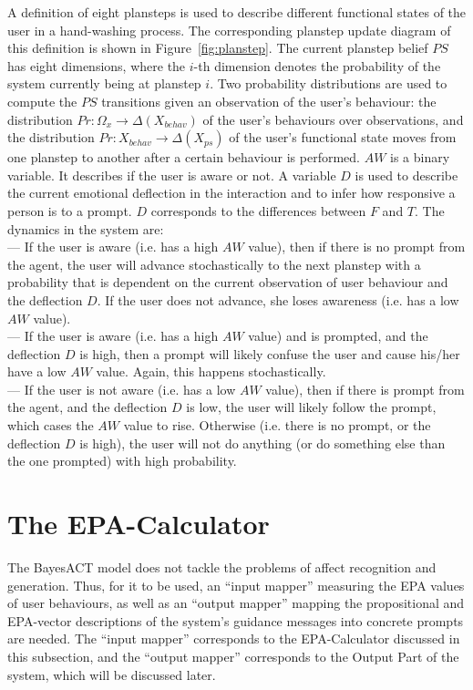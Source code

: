 A definition of eight plansteps is used to describe different functional states of the user in a hand-washing process. The corresponding planstep update diagram of this definition is shown in Figure~\ref{fig:planstep}. The current planstep belief $PS$ has eight dimensions, where the $i$-th dimension denotes the probability of the system currently being at planstep $i$. Two probability distributions are used to compute the $PS$ transitions given an observation of the user's behaviour: the distribution $Pr: \Omega_{x} \to \Delta(X_{behav})$ of the user's behaviours over observations, and the distribution $Pr: X_{behav} \to \Delta(X_{ps})$ of the user's functional state moves from one planstep to another after a certain behaviour is performed. $AW$ is a binary variable. It describes if the user is aware or not. A variable $D$ is used to describe the current emotional deflection in the interaction and to infer how responsive a person is to a prompt. $D$ corresponds to the differences between $F$ and $T$. The dynamics in the system are: \\
--- If the user is aware (i.e. has a high $AW$ value), then if there is no prompt from the agent, the user will advance stochastically to the next planstep with a probability that is dependent on the current observation of user behaviour and the deflection $D$. If the user does not advance, she loses awareness (i.e. has a low $AW$ value). \\
--- If the user is aware (i.e. has a high $AW$ value) and is prompted, and the deflection $D$ is high, then a prompt will likely confuse the user and cause his/her have a low $AW$ value. Again, this happens stochastically. \\
--- If the user is not aware (i.e. has a low $AW$ value), then if there is prompt from the agent, and the deflection $D$ is low, the user will likely follow the prompt, which cases the $AW$ value to rise. Otherwise (i.e. there is no prompt, or the deflection $D$ is high), the user will not do anything (or do something else than the one prompted) with high probability.

\section{The EPA-Calculator}

The BayesACT model does not tackle the problems of affect recognition and generation. Thus, for it to be used, an ``input mapper'' measuring the EPA values of user behaviours, as well as an ``output mapper'' mapping the propositional and EPA-vector descriptions of the system's guidance messages into concrete prompts are needed. The ``input mapper'' corresponds to the EPA-Calculator discussed in this subsection, and the ``output mapper'' corresponds to the Output Part of the system, which will be discussed later.

